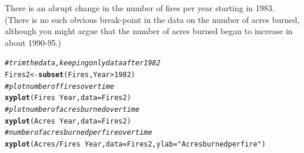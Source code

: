 \documentclass[twoside]{book}\usepackage[]{graphicx}\usepackage[]{xcolor}
\makeatletter
\newcommand{\hlnum}[1]{\textcolor[rgb]{0.686,0.059,0.569}{#1}}%
\newcommand{\hlstr}[1]{\textcolor[rgb]{0.192,0.494,0.8}{#1}}%
\newcommand{\hlcom}[1]{\textcolor[rgb]{0.678,0.584,0.686}{\textit{#1}}}%
\newcommand{\hlopt}[1]{\textcolor[rgb]{0,0,0}{#1}}%
\newcommand{\hlstd}[1]{\textcolor[rgb]{0.345,0.345,0.345}{#1}}%
\newcommand{\hlkwb}[1]{\textcolor[rgb]{0.69,0.353,0.396}{#1}}%
\newcommand{\hlkwc}[1]{\textcolor[rgb]{0.333,0.667,0.333}{#1}}%
\newcommand{\hlkwd}[1]{\textcolor[rgb]{0.737,0.353,0.396}{\textbf{#1}}}%
\newenvironment{kframe}{%
 \def\at@end@of@kframe{}%
 \ifinner\ifhmode%
  \def\at@end@of@kframe{\end{minipage}}%
  \begin{minipage}{\columnwidth}%
 \fi\fi%
 \def\FrameCommand##1{\hskip\@totalleftmargin \hskip-\fboxsep
 \colorbox{shadecolor}{##1}\hskip-\fboxsep
     \hskip-\linewidth \hskip-\@totalleftmargin \hskip\columnwidth}%
 \MakeFramed {\advance\hsize-\width
   \@totalleftmargin\z@ \linewidth\hsize
   \@setminipage}}%
 {\par\unskip\endMakeFramed%
 \at@end@of@kframe}
\newenvironment{knitrout}{}{} %
\makeatother
\begin{document}
\begin{solution}
\begin{knitrout}
{}



\end{knitrout}
There is an abrupt change in the number of fires per year starting in 1983. (There is no such obvious break-point in the data on the number of acres burned, although you might argue that the number of acres burned began to increase in about 1990-95.)

\begin{knitrout}
\color{fgcolor}\begin{kframe}
\begin{alltt}
\hlcom{# trim the data, keeping only data after 1982}
\hlstd{Fires2} \hlkwb{<-} \hlkwd{subset}\hlstd{(Fires, Year} \hlopt{>} \hlnum{1982}\hlstd{)}
\hlcom{# plot number of fires over time}
\hlkwd{xyplot}\hlstd{(Fires} \hlopt{~} \hlstd{Year,} \hlkwc{data} \hlstd{= Fires2)}
\hlcom{# plot number of acres burned over time}
\hlkwd{xyplot}\hlstd{(Acres} \hlopt{~} \hlstd{Year,} \hlkwc{data} \hlstd{= Fires2)}
\hlcom{# number of acres burned per fire over time}
\hlkwd{xyplot}\hlstd{(Acres}\hlopt{/}\hlstd{Fires} \hlopt{~} \hlstd{Year,} \hlkwc{data} \hlstd{= Fires2,} \hlkwc{ylab} \hlstd{=} \hlstr{"Acres burned per fire"}\hlstd{)}
\end{alltt}
\end{kframe}


\end{knitrout}
\end{solution}
\end{document}
